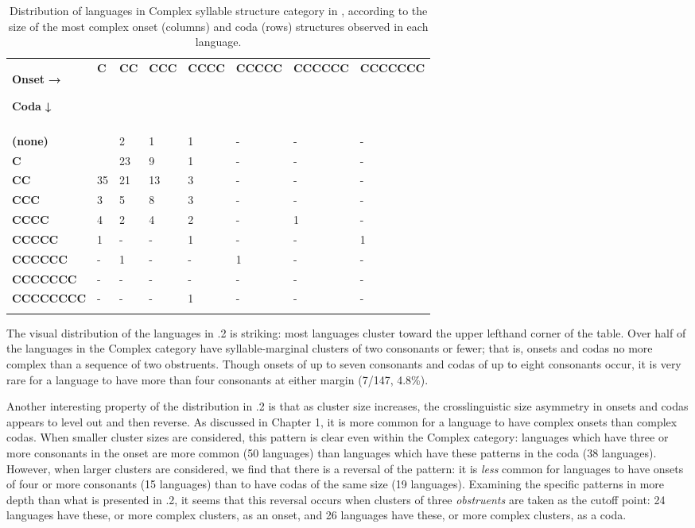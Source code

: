 \begin{table}
\begin{tabularx}{\textwidth}{XXXXXXXX}
\lsptoprule
{ \textbf{Onset} \textbf{→}}

 \textbf{Coda} \textbf{↓} & \textbf{C} & \textbf{CC} & \textbf{CCC} & \textbf{CCCC} & \textbf{CCCCC} & \textbf{CCCCCC} & \textbf{CCCCCCC}\\
&  &  &  &  &  &  & \\
 \textbf{(none)} &  & 2 & 1 & 1 & - & - & -\\
\hhline{-~------}
 \textbf{C} &  & 23 & 9 & 1 & - & - & -\\
 \textbf{CC} & 35 & 21 & 13 & 3 & - & - & -\\
 \textbf{CCC} & 3 & 5 & 8 & 3 & - & - & -\\
 \textbf{CCCC} & 4 & 2 & 4 & 2 & - & 1 & -\\
 \textbf{CCCCC} & 1 & - & - & 1 & - & - & 1\\
 \textbf{CCCCCC} & - & 1 & - & - & 1 & - & -\\
 \textbf{CCCCCCC} & - & - & - & - & - & - & -\\
 \textbf{CCCCCCCC} & - & - & - & 1 & - & - & -\\
\lspbottomrule
\end{tabularx}
\caption{\label{tab:key:2.2.} Distribution of languages in Complex syllable structure category in \citet{Maddieson2013a}, according to the size of the most complex onset (columns) and coda (rows) structures observed in each language.}
\end{table}

  The visual distribution of the languages in .2 is striking: most languages cluster toward the upper lefthand corner of the table. Over half of the languages in the Complex category have syllable-marginal clusters of two consonants or fewer; that is, onsets and codas no more complex than a sequence of two obstruents. Though onsets of up to seven consonants and codas of up to eight consonants occur, it is very rare for a language to have more than four consonants at either margin (7/147, 4.8\%).

  Another interesting property of the distribution in .2 is that as cluster size increases, the crosslinguistic size asymmetry in onsets and codas appears to level out and then reverse. As discussed in Chapter 1, it is more common for a language to have complex onsets than complex codas. When smaller cluster sizes are considered, this pattern is clear even within the Complex category: languages which have three or more consonants in the onset are more common (50 languages) than languages which have these patterns in the coda (38 languages). However, when larger clusters are considered, we find that there is a reversal of the pattern: it is \textit{less} common for languages to have onsets of four or more consonants (15 languages) than to have codas of the same size (19 languages). Examining the specific patterns in more depth than what is presented in .2, it seems that this reversal occurs when clusters of three \textit{obstruents} are taken as the cutoff point: 24 languages have these, or more complex clusters, as an onset, and 26 languages have these, or more complex clusters, as a coda.


